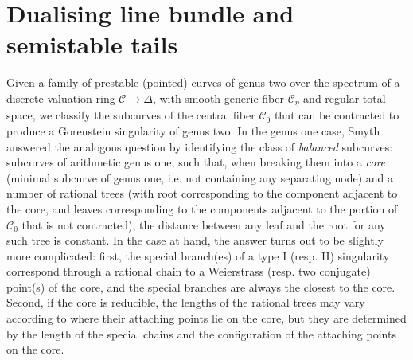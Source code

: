 \documentclass[11pt]{amsart}
\renewcommand{\to}{\rightarrow}
\newcommand{\dvr}{\Delta}
\theoremstyle{plain}
\theoremstyle{definition}
\begin{document}
\section{Dualising line bundle and semistable tails}

Given a family of prestable (pointed) curves of genus two over the spectrum of a discrete valuation ring $\mathcal C\to\dvr$, with smooth generic fiber $\mathcal C_{\eta}$ and regular total space, we classify the subcurves of the central fiber $\mathcal C_{0}$ that can be contracted to produce a Gorenstein singularity of genus two. In the genus one case, Smyth answered the analogous question by identifying the class of \emph{balanced} subcurves: subcurves of arithmetic genus one, such that, when breaking them into a \emph{core} (minimal subcurve of genus one, i.e. not containing any separating node) and a number of rational trees (with root corresponding to the component adjacent to the core, and leaves corresponding to the components adjacent to the portion of $\mathcal C_0$ that is not contracted), the distance between any leaf and the root for any such tree is constant. In the case at hand, the answer turns out to be slightly more complicated: first, the special branch(es) of a type I (resp. II) singularity correspond through a rational chain to a Weierstrass (resp. two conjugate) point(s) of the core, and the special branches are always the closest to the core. Second, if the core is reducible, the lengths of the rational trees may vary according to where their attaching points lie on the core, but they are determined by the length of the special chains and the configuration of the attaching points on the core.
\end{document}
